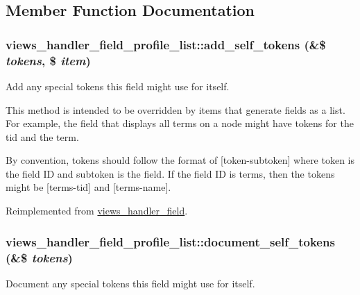 \subsection{Member Function Documentation}
\hypertarget{classviews__handler__field__profile__list_a411c5238debac02e7cb3f582f7cd8e9f}{
\subsubsection[{add\_\-self\_\-tokens}]{\setlength{\rightskip}{0pt plus 5cm}views\_\-handler\_\-field\_\-profile\_\-list::add\_\-self\_\-tokens (\&\$ {\em tokens}, \/  \$ {\em item})}}
\label{classviews__handler__field__profile__list_a411c5238debac02e7cb3f582f7cd8e9f}
Add any special tokens this field might use for itself.

This method is intended to be overridden by items that generate fields as a list. For example, the field that displays all terms on a node might have tokens for the tid and the term.

By convention, tokens should follow the format of \mbox{[}token-\/subtoken\mbox{]} where token is the field ID and subtoken is the field. If the field ID is terms, then the tokens might be \mbox{[}terms-\/tid\mbox{]} and \mbox{[}terms-\/name\mbox{]}. 

Reimplemented from \hyperlink{classviews__handler__field_ac61cc83a4c8c579993a254b5b1e16cbc}{views\_\-handler\_\-field}.\hypertarget{classviews__handler__field__profile__list_ab3950ce980ce3c8e8ce274a25b4e3351}{
\subsubsection[{document\_\-self\_\-tokens}]{\setlength{\rightskip}{0pt plus 5cm}views\_\-handler\_\-field\_\-profile\_\-list::document\_\-self\_\-tokens (\&\$ {\em tokens})}}
\label{classviews__handler__field__profile__list_ab3950ce980ce3c8e8ce274a25b4e3351}
Document any special tokens this field might use for itself.

